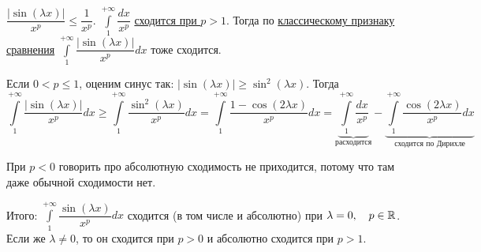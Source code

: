 \documentclass[../main.tex]{subfiles}
\begin{document}
\( \dfrac{ \left|\sin\left(\lambda x\right)\right|}{ x^p} \leq  \dfrac{ 1}{ x^p} \). \( \displaystyle\int\limits_{ 1}^{ + \infty } \dfrac{ dx}{ x^p}\) \hyperlink{ex:converge}{сходится при \( p>1\)}. Тогда по \hyperlink{thm:converge_classic}{классическому признаку сравнения} \( \displaystyle\int\limits_{ 1}^{ + \infty } \dfrac{ \left|\sin\left(\lambda x\right)\right|}{ x^p} dx \) тоже сходится. 

Если \( 0 < p \leq 1\), оценим синус так: \( \left| \sin\left( \lambda x\right)\right| \geq \sin^2\left( \lambda x\right)\). Тогда 
\[ \displaystyle\int\limits_{ 1}^{ + \infty } \dfrac{ \left|\sin\left(\lambda x\right)\right|}{ x^p} dx \geq \displaystyle\int\limits_{ 1}^{ + \infty } \dfrac{ \sin^2\left( \lambda x\right)}{ x^p} dx= \displaystyle\int\limits_{ 1}^{ + \infty } \dfrac{ 1-\cos\left(2\lambda x\right)}{ x^p}dx= \underbrace{\displaystyle\int\limits_{ 1}^{ + \infty } \dfrac{ dx}{ x^p}}_{\text{расходится}} - \underbrace{\displaystyle\int\limits_{ 1}^{ + \infty } \dfrac{ \cos\left(2\lambda x\right)}{ x^p}dx}_{\text{сходится по Дирихле}} \]

При \( p < 0\) говорить про абсолютную сходимость не приходится, потому что там даже обычной сходимости нет. 

Итого: \( \displaystyle\int\limits_{ 1}^{ + \infty } \dfrac{ \sin\left(\lambda x\right)}{ x^p} dx\) сходится (в том числе и абсолютно) при \( \lambda =0,\quad p \in \mathbb{R} \). Если же \( \lambda \neq 0\), то он сходится при \( p > 0\) и абсолютно сходится при \( p > 1\).
\end{document}
